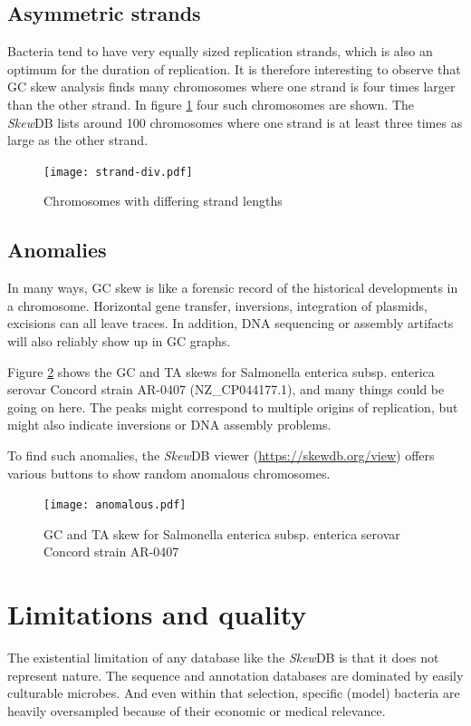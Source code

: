 \documentclass[9pt,twocolumn,twoside]{pnas-new}
\begin{document}
\subsection*{Asymmetric strands}
Bacteria tend to have very equally sized replication strands, which is also an optimum for the duration of replication. It is therefore interesting to observe that GC skew analysis finds many chromosomes where one strand is four times larger than the other strand.  In  figure \ref{fig:strand-div} four such chromosomes are shown. The \emph{Skew}DB lists around 100 chromosomes where one strand is at least three times as large as the other strand.
\begin{figure}[ht]
\centering
\texttt{[image: strand-div.pdf]}
\caption{Chromosomes with differing strand lengths}
\label{fig:strand-div}
\end{figure}


\subsection*{Anomalies}
In many ways, GC skew is like a forensic record of the historical developments in a chromosome. Horizontal gene transfer, inversions, integration of plasmids, excisions can all leave traces. In addition, DNA sequencing or assembly artifacts will also reliably show up in GC graphs.

Figure \ref{fig:anomalous} shows the GC and TA skews for Salmonella enterica subsp. enterica serovar Concord strain AR-0407 (NZ\_CP044177.1), and many things could be going on here. The peaks might correspond to multiple origins of replication, but might also indicate inversions or DNA assembly problems.

To find such anomalies, the \emph{Skew}DB viewer (\url{https://skewdb.org/view}) offers various buttons to show random anomalous chromosomes. 

\begin{figure}[ht]
\centering
\texttt{[image: anomalous.pdf]}
\caption{GC and TA skew for Salmonella enterica subsp. enterica serovar Concord strain AR-0407}
\label{fig:anomalous}
\end{figure}

\section*{Limitations and quality}
The existential limitation of any database like the \emph{Skew}DB is that it does not represent nature. The sequence and annotation databases are dominated by easily culturable microbes. And even within that selection, specific (model) bacteria are heavily oversampled because of their economic or medical relevance.
\end{document}
